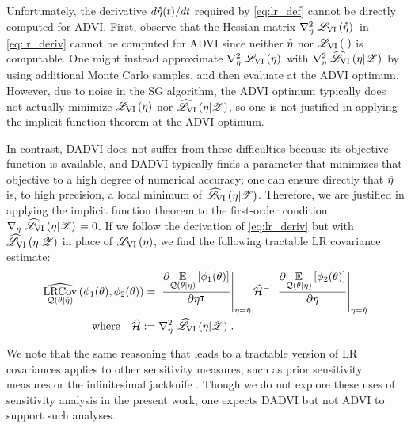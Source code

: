 Unfortunately, the derivative $d\accentset{*}{\eta}(t) / dt$ required by \cref{eq:lr_def}
cannot be directly computed for ADVI. %
%
First, observe that the Hessian matrix $\nabla^2_{\eta} \left. \mathscr{L}_{\mathrm{VI}}\left(\accentset{*}{\eta}\right) \right.$ in
\cref{eq:lr_deriv} cannot be computed for ADVI since neither $\accentset{*}{\eta}$ nor
$\mathscr{L}_{\mathrm{VI}}\left(\cdot\right)$ is computable.  One might instead approximate
$\nabla^2_{\eta} \left. \mathscr{L}_{\mathrm{VI}}\left(\eta\right) \right.$ with $\nabla^2_{\eta} \left. \widehat{\mathscr{L}}_{\mathrm{VI}}\left(\eta \vert \mathscr{Z}\right) \right.$ by
using additional Monte Carlo samples, and then evaluate at the ADVI optimum.
However, due to noise in the SG algorithm, the ADVI optimum typically does not
actually minimize $\mathscr{L}_{\mathrm{VI}}\left(\eta\right)$ nor $\widehat{\mathscr{L}}_{\mathrm{VI}}\left(\eta \vert \mathscr{Z}\right)$, so one is not
justified in applying the implicit function theorem at the ADVI optimum.

In contrast, DADVI does not suffer from these difficulties because its objective
function is available, and DADVI typically finds a parameter that minimizes that
objective to a high degree of numerical accuracy; one can ensure directly that
$\hat{\eta}$ is, to high precision, a local minimum of $\widehat{\mathscr{L}}_{\mathrm{VI}}\left(\eta | \mathscr{Z}\right)$. 
Therefore, we are justified  in applying the implicit
function theorem to the first-order condition $\nabla_{\eta} \left. \widehat{\mathscr{L}}_{\mathrm{VI}}\left(\eta \vert
\mathscr{Z}\right) \right. = 0$.  If we follow the derivation of \cref{eq:lr_deriv} but
with $\widehat{\mathscr{L}}_{\mathrm{VI}}\left(\eta \vert \mathscr{Z}\right)$ in place of $\mathscr{L}_{\mathrm{VI}}\left(\eta\right)$, we find
the following tractable LR covariance estimate:
%
\begin{align}\label{eq:lr_deriv_dadvi}
%
\lrcov{\q(\theta \vert \etahat)}{\phi_1(\theta), \phi_2(\theta)}
={}&
\fracat{\partial \expect{\q(\theta \vert \eta)}{\phi_1(\theta)}}
      {\partial\eta^\trans}{\eta=\etahat}
\h^{-1}
\fracat{\partial \expect{\q(\theta \vert \eta)}{\phi_2(\theta)}}
     {\partial\eta}{\eta=\etahat}  \\
\quad\textrm{where}\quad
     \h :={}& \hess{\eta}{\klobj{\eta \vert \Z}}. \nonumber
\end{align}

%


We note that the same reasoning that leads to a tractable version of LR
covariances applies to other sensitivity measures, such as prior sensitivity
measures \citep{giordano:2023:bnp} or the infinitesimal jackknife
\citep{giordano:2019:swiss}. Though we do not explore these uses of sensitivity analysis
in the present work, one expects DADVI but not ADVI to support such analyses.
